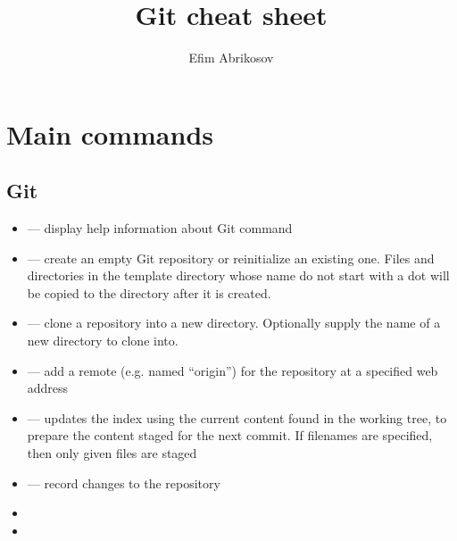 \documentclass[12pt]{article}
\begin{document}
\title{Git cheat sheet}
\author{Efim Abrikosov}
\maketitle


\section{Main commands}
\subsection{Git}
\begin{itemize}
  \item {} --- display help information about Git command
  \item {} --- create an empty Git repository or reinitialize an existing one. Files and directories in the template directory whose name do not start with a dot will be copied to the directory after it is created.
  \item {} --- clone a repository into a new directory. Optionally supply the name of a new directory to clone into.
  \item {} --- add a remote (e.g. named ``origin'') for the repository at a specified web address
  \item {} --- updates the index using the current content found in the working tree, to prepare the content staged for the next commit. If filenames are specified, then only given files are staged
  \item {} --- record changes to the repository
  \item {}
  \item {}
\end{itemize}
\end{document}
